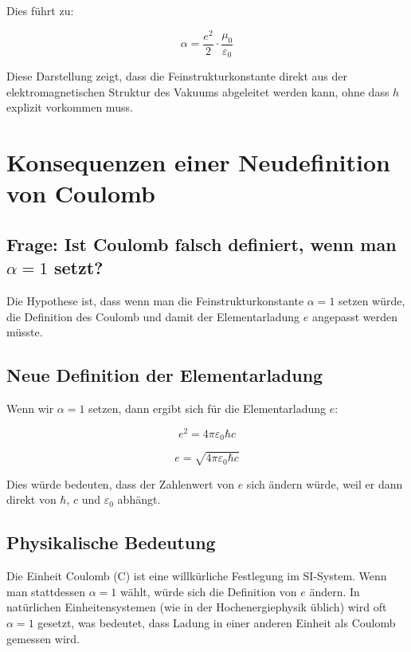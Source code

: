 \documentclass{article}
\begin{document}
Dies führt zu:

\begin{equation}
	\alpha = \frac{e^2}{2} \cdot \frac{\mu_0}{\varepsilon_0}
\end{equation}

Diese Darstellung zeigt, dass die Feinstrukturkonstante direkt aus der elektromagnetischen Struktur des Vakuums abgeleitet werden kann, ohne dass $h$ explizit vorkommen muss.

\section{Konsequenzen einer Neudefinition von Coulomb}

\subsection{Frage: Ist Coulomb falsch definiert, wenn man $\alpha = 1$ setzt?}

Die Hypothese ist, dass wenn man die Feinstrukturkonstante $\alpha = 1$ setzen würde, die Definition des Coulomb und damit der Elementarladung $e$ angepasst werden müsste.

\subsection{Neue Definition der Elementarladung}

Wenn wir $\alpha = 1$ setzen, dann ergibt sich für die Elementarladung $e$:

\begin{equation}
	e^2 = 4\pi\varepsilon_0\hbar c
\end{equation}

\begin{equation}
	e = \sqrt{4\pi\varepsilon_0\hbar c}
\end{equation}

Dies würde bedeuten, dass der Zahlenwert von $e$ sich ändern würde, weil er dann direkt von $\hbar$, $c$ und $\varepsilon_0$ abhängt.

\subsection{Physikalische Bedeutung}

Die Einheit Coulomb (C) ist eine willkürliche Festlegung im SI-System. Wenn man stattdessen $\alpha = 1$ wählt, würde sich die Definition von $e$ ändern. In natürlichen Einheitensystemen (wie in der Hochenergiephysik üblich) wird oft $\alpha = 1$ gesetzt, was bedeutet, dass Ladung in einer anderen Einheit als Coulomb gemessen wird.
\end{document}
